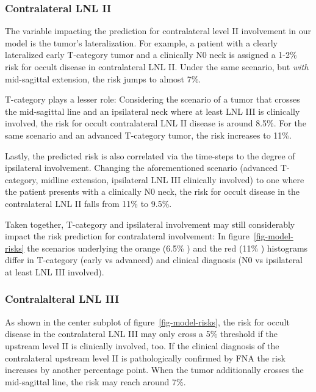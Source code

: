 \documentclass[
  sn-mathphys-num,
]{sn-jnl}
\begin{document}
\subsubsection{Contralateral LNL II}\label{contralateral-lnl-ii}

The variable impacting the prediction for contralateral level II
involvement in our model is the tumor's lateralization. For example, a
patient with a clearly lateralized early T-category tumor and a
clinically N0 neck is assigned a 1-2\% risk for occult disease in
contralateral LNL II. Under the same scenario, but \emph{with}
mid-sagittal extension, the risk jumps to almost 7\%.

T-category plays a lesser role: Considering the scenario of a tumor that
crosses the mid-sagittal line and an ipsilateral neck where at least LNL
III is clinically involved, the risk for occult contralateral LNL II
disease is around 8.5\%. For the same scenario and an advanced
T-category tumor, the risk increases to 11\%.

Lastly, the predicted risk is also correlated via the time-steps to the
degree of ipsilateral involvement. Changing the aforementioned scenario
(advanced T-category, midline extension, ipsilateral LNL III clinically
involved) to one where the patient presents with a clinically N0 neck,
the risk for occult disease in the contralateral LNL II falls from 11\%
to 9.5\%.

Taken together, T-category and ipsilateral involvement may still
considerably impact the risk prediction for contralateral involvement:
In figure~\ref{fig-model-risks} the scenarios underlying the orange
(6.5\% ) and the red (11\% ) histograms differ in T-category (early vs
advanced) and clinical diagnosis (N0 vs ipsilateral at least LNL III
involved).

\subsubsection{Contralalteral LNL III}\label{contralalteral-lnl-iii}

As shown in the center subplot of figure~\ref{fig-model-risks}, the risk
for occult disease in the contralateral LNL III may only cross a 5\%
threshold if the upstream level II is clinically involved, too. If the
clinical diagnosis of the contralateral upstream level II is
pathologically confirmed by FNA the risk increases by another percentage
point. When the tumor additionally crosses the mid-sagittal line, the
risk may reach around 7\%.
\end{document}
